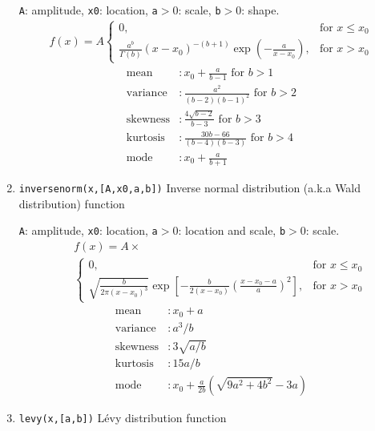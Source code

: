 \documentclass[reprint,showpacs,prb,nofootinbib,amsmath,amssymb]{revtex4-1}
\begin{document}
\begin{enumerate}
\verb|A|: amplitude, \verb|x0|: location, \verb|a|$>0$: scale, \verb|b|$>0$: shape.
\begin{eqnarray}
f(x)=A
\begin{cases}
0, &\text{for }x\leq x_0 \\
\frac{a^b}{\Gamma(b)}(x-x_0)^{-(b+1)}\exp\left(-\frac{a}{x-x_0}\right), &\text{for }x>x_0  \nonumber
\end{cases}
\end{eqnarray}
\begin{align}
	\mbox{mean} 		&: \mbox{$x_0+\frac{a}{b-1}$ for $b>1$} \nonumber \\
	\mbox{variance}		&: \mbox{$\frac{a^2}{(b-2)(b-1)^2}$ for $b>2$} \nonumber \\
	\mbox{skewness} 	&: \mbox{$\frac{4\sqrt{b-2}}{b-3}$ for $b>3$} \nonumber \\	
	\mbox{kurtosis} 	&: \mbox{$\frac{30b-66}{(b-4)(b-3)}$ for $b>4$} \nonumber \\	
	\mbox{mode}         &: \mbox{$x_0+\frac{a}{b+1}$}  \nonumber
\end{align}

\item \verb|inversenorm(x,[A,x0,a,b])| Inverse normal distribution (a.k.a Wald distribution) function~\cite{McLaughlin,inversenorm}

\verb|A|: amplitude, \verb|x0|: location, \verb|a|$>0$: location and scale, \verb|b|$>0$: scale.
\begin{eqnarray}
&&f(x)=A\times \nonumber \\
&&
\begin{cases}
0, &\text{for }x\leq x_0 \\
\sqrt{\frac{b}{2\pi(x-x_0)^3}}\exp\left[-\frac{b}{2(x-x_0)}\left(\frac{x-x_0-a}{a}\right)^2\right], &\text{for }x>x_0  \nonumber
\end{cases}
\end{eqnarray}
\begin{align}
	\mbox{mean} 		&: \mbox{$x_0+a$} \nonumber \\
	\mbox{variance}		&: \mbox{$a^3/b$} \nonumber \\
	\mbox{skewness} 	&: \mbox{$3\sqrt{a/b}$} \nonumber \\	
	\mbox{kurtosis} 	&: \mbox{$15a/b$} \nonumber \\	
	\mbox{mode}         &: \mbox{$x_0+\frac{a}{2b}\left(\sqrt{9a^2+4b^2}-3a\right)$}  \nonumber
\end{align}

\item \verb|levy(x,[a,b])| L\'{e}vy distribution function~\cite{McLaughlin}


\end{enumerate}
\end{document}
